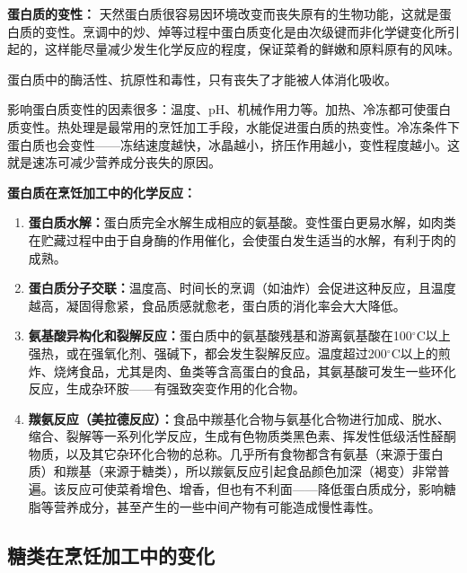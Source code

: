\begin{tipbox}
\textbf{蛋白质的变性：}%
天然蛋白质很容易因环境改变而丧失原有的生物功能，这就是蛋白质的变性。烹调中的炒、焯等过程中蛋白质变化是由次级键而非化学键变化所引起的，这样能尽量减少发生化学反应的程度，保证菜肴的鲜嫩和原料原有的风味。

蛋白质中的酶活性、抗原性和毒性，只有丧失了才能被人体消化吸收。

影响蛋白质变性的因素很多：温度、pH、机械作用力等。加热、冷冻都可使蛋白质变性。热处理是最常用的烹饪加工手段，水能促进蛋白质的热变性。冷冻条件下蛋白质也会变性——冻结速度越快，冰晶越小，挤压作用越小，变性程度越小。这就是速冻可减少营养成分丧失的原因。

\textbf{蛋白质在烹饪加工中的化学反应：}
\begin{enumerate}[leftmargin=*]
    \item \textbf{蛋白质水解：}蛋白质完全水解生成相应的氨基酸。变性蛋白更易水解，如肉类在贮藏过程中由于自身酶的作用催化，会使蛋白发生适当的水解，有利于肉的成熟。
    \item \textbf{蛋白质分子交联：}温度高、时间长的烹调（如油炸）会促进这种反应，且温度越高，凝固得愈紧，食品质感就愈老，蛋白质的消化率会大大降低。
    \item \textbf{氨基酸异构化和裂解反应：}蛋白质中的氨基酸残基和游离氨基酸在100$^\circ$C以上强热，或在强氧化剂、强碱下，都会发生裂解反应。温度超过200$^\circ$C以上的煎炸、烧烤食品，尤其是肉、鱼类等含高蛋白的食品，其氨基酸可发生一些环化反应，生成杂环胺——有强致突变作用的化合物。
    \item \textbf{羰氨反应（美拉德反应）：}食品中羰基化合物与氨基化合物进行加成、脱水、缩合、裂解等一系列化学反应，生成有色物质类黑色素、挥发性低级活性醛酮物质，以及其它杂环化合物的总称。几乎所有食物都含有氨基（来源于蛋白质）和羰基（来源于糖类），所以羰氨反应引起食品颜色加深（褐变）非常普遍。该反应可使菜肴增色、增香，但也有不利面——降低蛋白质成分，影响糖脂等营养成分，甚至产生的一些中间产物有可能造成慢性毒性。
\end{enumerate}
\end{tipbox}

\subsection{糖类在烹饪加工中的变化}

